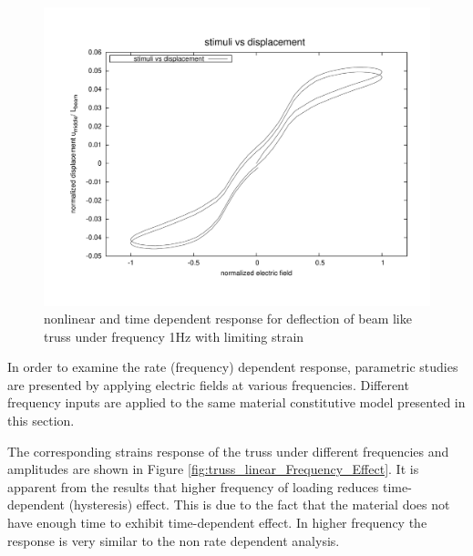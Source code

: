 \begin{figure}  
\centering
\includegraphics[width=5.0in]{./chap_5_active_trusses/images_non_linear_time_dependent_constitutive_equatio/limiting_strain_linear_tetrahedral_time_dependent_efield_vs_displacement_nonlinear.pdf}
\caption{nonlinear and time dependent response for deflection of beam like truss under frequency 1Hz with limiting strain}
\label{fig:limiting_strain_linear_tetrahedral_time_dependent_efield_vs_displacement_nonlinear}
\end{figure} 

In order to examine the rate (frequency) dependent response, parametric studies are presented by applying electric fields at various frequencies. 
Different frequency inputs are applied to the same material constitutive model presented in this section. 

The corresponding strains response of the truss under different frequencies and amplitudes are shown in Figure \ref{fig:truss_linear_Frequency_Effect}. 
It is apparent from the results that higher frequency of loading reduces time-dependent (hysteresis) effect. 
This is due to the fact that the material does not have enough time to exhibit time-dependent effect. 
In higher frequency the response is very similar to the non rate dependent analysis. 


